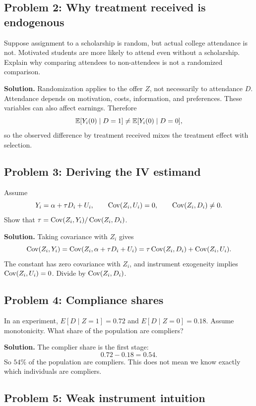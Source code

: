 \subsection{Problem 2: Why treatment received is endogenous}

Suppose assignment to a scholarship is random, but actual college attendance is
not. Motivated students are more likely to attend even without a scholarship.
Explain why comparing attendees to non-attendees is not a randomized comparison.

\textbf{Solution.} Randomization applies to the offer $Z$, not necessarily to
attendance $D$. Attendance depends on motivation, costs, information, and
preferences. These variables can also affect earnings. Therefore
\[
    \mathbb{E}[Y_i(0) \mid D=1] \neq \mathbb{E}[Y_i(0) \mid D=0],
\]
so the observed difference by treatment received mixes the treatment effect
with selection.

\subsection{Problem 3: Deriving the IV estimand}

Assume
\[
    Y_i=\alpha+\tau D_i+U_i,
    \qquad \operatorname{Cov}(Z_i,U_i)=0,
    \qquad \operatorname{Cov}(Z_i,D_i)\neq 0.
\]
Show that $\tau=\operatorname{Cov}(Z_i,Y_i)/\operatorname{Cov}(Z_i,D_i)$.

\textbf{Solution.} Taking covariance with $Z_i$ gives
\[
    \operatorname{Cov}(Z_i,Y_i)
    =
    \operatorname{Cov}(Z_i,\alpha+\tau D_i+U_i)
    =
    \tau\operatorname{Cov}(Z_i,D_i)+\operatorname{Cov}(Z_i,U_i).
\]
The constant has zero covariance with $Z_i$, and instrument exogeneity implies
$\operatorname{Cov}(Z_i,U_i)=0$. Divide by $\operatorname{Cov}(Z_i,D_i)$.

\subsection{Problem 4: Compliance shares}

In an experiment, $E[D\mid Z=1]=0.72$ and $E[D\mid Z=0]=0.18$. Assume
monotonicity. What share of the population are compliers?

\textbf{Solution.} The complier share is the first stage:
\[
    0.72-0.18=0.54.
\]
So $54\%$ of the population are compliers. This does not mean we know exactly
which individuals are compliers.

\subsection{Problem 5: Weak instrument intuition}

